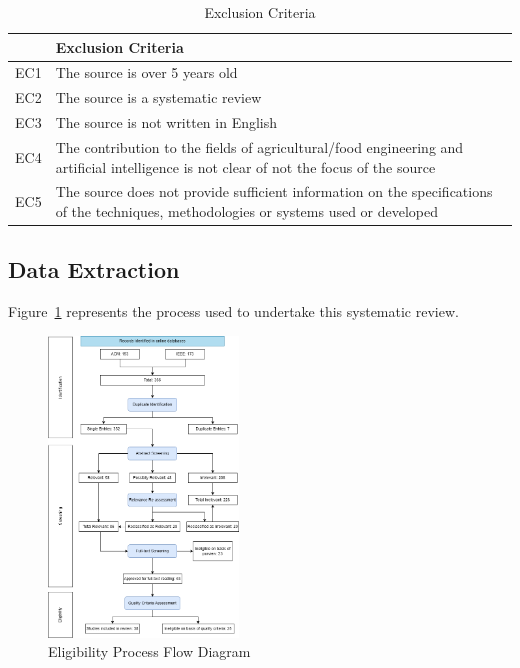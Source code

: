 \documentclass[conference]{IEEEtran}
\begin{document}
\begin{table}
	\caption{Exclusion Criteria}
	\label{tab:exccrit}

	\begin{tabular}{ll}
	\hline
		 & Exclusion Criteria \\
	\hline
		EC1 & The source is over 5 years old \\
		EC2 & The source is a systematic review \\
		EC3 & The source is not written in English \\
		EC4 & The contribution to the fields of agricultural/food engineering and artificial intelligence is not clear of not the focus of the source \\
		EC5 & The source does not provide sufficient information on the specifications of the techniques, methodologies or systems used or developed \\
	\hline
	\end{tabular}
\end{table}

\subsection{Data Extraction}

Figure~\ref{fig:elig} represents the process used to undertake this systematic review.

\begin{figure}[tb]
	\centering
	\includegraphics[width=0.45\textwidth]{images/eligibilityprocess.png}
	\caption{Eligibility Process Flow Diagram}
	\label{fig:elig}
\end{figure}
\end{document}
